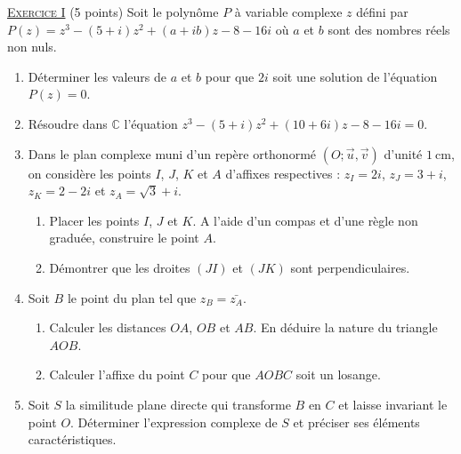\providecommand{\cm}{~\mathrm{cm}}

\noindent \underline{\textsc{Exercice I}} (5 points) \newline
      Soit le polyn\^ome $P$ \`a variable complexe $z$ d\'efini par 
      $P(z) = z^3 - (5+i) z^2 + (a + ib) z - 8 - 16 i$ o\`u $a$ et $b $ sont des nombres r\'eels non nuls.
      \begin{enumerate}
            \item D\'eterminer les valeurs de $a$ et $b$ pour que $2i$ soit une solution de l'\'equation $P(z) = 0$.
            \item R\'esoudre dans $\mathbb{C}$ l'\'equation 
                  $z^3 - (5+i) z^2 + (10 + 6i) z - 8 - 16 i = 0$.
            \item Dans le plan complexe muni d'un rep\`ere orthonorm\'e $(O ; \vec{u} , \vec{v} )$ d'unit\'e $1\cm$,
                  on consid\`ere les points $I$, $J$, $K$ et $A$ d'affixes respectives :
                  $z_I = 2i$, $z_J = 3 + i$, $z_K = 2 - 2i$ et $z_A = \sqrt{3} + i$.
                  \begin{enumerate}
                        \item Placer les points $I$, $J$ et $K$.
                              A l'aide d'un compas et d'une r\`egle non gradu\'ee, construire le point $A$.
                        \item D\'emontrer que les droites $(JI)$ et $(JK)$ sont perpendiculaires.
                  \end{enumerate}
            \item Soit $B$ le point du plan tel que $z_B = \bar{z_A}$.
                  \begin{enumerate}
                        \item Calculer les distances $OA$, $OB$ et $AB$.
                              En d\'eduire la nature du triangle $AOB$.
                        \item Calculer l'affixe du point $C$ pour que $AOBC$ soit un losange.
                  \end{enumerate}
            \item Soit $S$ la similitude plane directe qui transforme $B$ en $C$ et laisse invariant le point $O$.
                  D\'eterminer l'expression complexe de $S$ et pr\'eciser ses \'el\'ements caract\'eristiques.
      \end{enumerate}

